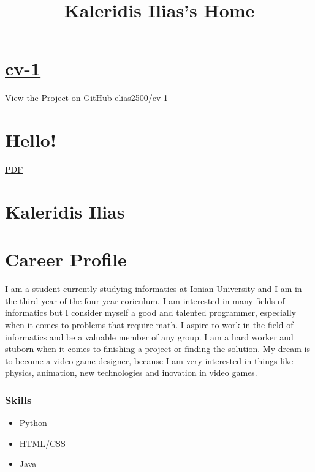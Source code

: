 \documentclass[american,]{article}
\title{Kaleridis Ilias's Home}
\date{}
\begin{document}
\maketitle

\hypertarget{cv-1}{%
\section{\texorpdfstring{\href{https://elias2500.github.io/cv-1/}{cv-1}}{cv-1}}\label{cv-1}}

\href{https://github.com/elias2500/cv-1}{View the Project on GitHub
{elias2500/cv-1}}

\hypertarget{hello}{%
\section{Hello!}\label{hello}}

\href{pdf/index.pdf}{PDF}

\hypertarget{kaleridis-ilias}{%
\section{Kaleridis Ilias}\label{kaleridis-ilias}}

\hypertarget{career-profile}{%
\section{Career Profile}\label{career-profile}}

I am a student currently studying informatics at Ionian University and I
am in the third year of the four year coriculum. I am interested in many
fields of informatics but I consider myself a good and talented
programmer, especially when it comes to problems that require math. I
aspire to work in the field of informatics and be a valuable member of
any group. I am a hard worker and stuborn when it comes to finishing a
project or finding the solution. My dream is to become a video game
designer, because I am very interested in things like physics,
animation, new technologies and inovation in video games.

\hypertarget{skills}{%
\subsubsection{Skills}\label{skills}}

\begin{itemize}
\item
  Python
\item
  HTML/CSS
\item
  Java
\end{itemize}
\end{document}
